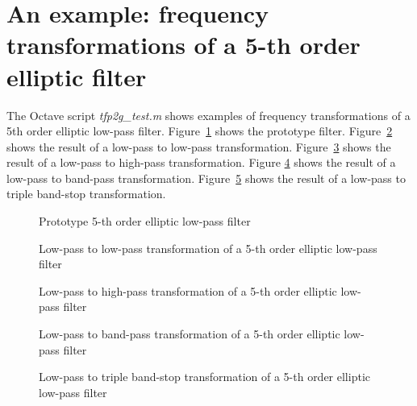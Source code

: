 \documentclass[a4paper,twoside,10pt,english]{report}
\begin{document}
\section{\label{sec:example-frequency-transformations-of-5-th-order-elliptic-filter}An example: frequency transformations of a 5-th order elliptic filter}
The Octave script \emph{tfp2g\_test.m}
shows examples of frequency transformations of a 5th order
elliptic low-pass filter. Figure~\ref{fig:tfp2g-lpproto} shows
the prototype filter. Figure~\ref{fig:tfp2g-lp} shows the result of a 
low-pass to low-pass transformation. Figure~\ref{fig:tfp2g-hp} shows the
result of a low-pass to high-pass transformation. Figure 
\ref{fig:tfp2g-bp} shows the result of a low-pass to 
band-pass transformation. Figure~\ref{fig:tfp2g-bs} shows the 
result of a low-pass to triple band-stop
transformation.
\begin{figure}[!htbp]
\begin{center}
\scalebox{0.7}{}
\caption{Prototype 5-th order elliptic low-pass filter}
\label{fig:tfp2g-lpproto}
\end{center}
\end{figure}
\begin{figure}[!htbp]
\begin{center}
\scalebox{0.7}{}
\caption{Low-pass to low-pass transformation of a 
5-th order elliptic low-pass filter}
\label{fig:tfp2g-lp}
\end{center}
\end{figure}
\begin{figure}[!htbp]
\begin{center}
\scalebox{0.7}{}
\caption{Low-pass to high-pass transformation of a 
5-th order elliptic low-pass filter}
\label{fig:tfp2g-hp}
\end{center}
\end{figure}
\begin{figure}[!htbp]
\begin{center}
\scalebox{0.7}{}
\caption{Low-pass to band-pass transformation of a 
5-th order elliptic low-pass filter}
\label{fig:tfp2g-bp}
\end{center}
\end{figure}
\begin{figure}[!htbp]
\begin{center}
\scalebox{0.7}{}
\caption{Low-pass to triple band-stop transformation
of a 5-th order elliptic low-pass filter}
\label{fig:tfp2g-bs}
\end{center}
\end{figure}
\cleardoublepage{}
\end{document}
